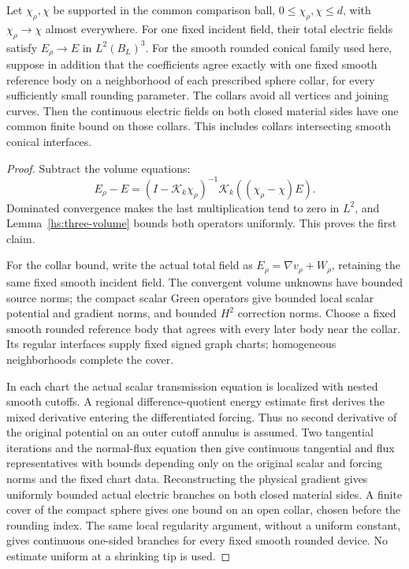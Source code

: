 \begin{lemma}
\label{hs:three-rounding}
Let $\chi_\rho,\chi$ be supported in the common comparison ball,
$0\leq\chi_\rho,\chi\leq d$, with $\chi_\rho\to\chi$ almost
everywhere.  For one fixed incident field, their total electric
fields satisfy $E_\rho\to E$ in $L^2(B_L)^3$.
For the smooth rounded conical family used here, suppose in addition
that the coefficients agree exactly with one fixed smooth reference
body on a neighborhood of each prescribed sphere collar, for every
sufficiently small rounding parameter.  The collars avoid all vertices
and joining curves.  Then the continuous electric fields on both closed
material sides have one common finite bound on those collars.  This
includes collars intersecting smooth conical interfaces.
\end{lemma}

\begin{proof}
Subtract the volume equations:
\begin{equation}
 E_\rho-E=(I-\mathcal K_k\chi_\rho)^{-1}
                  \mathcal K_k((\chi_\rho-\chi)E).
 \label{hs:three-rounding-identity}
\end{equation}
Dominated convergence makes the last multiplication tend to zero
in $L^2$, and Lemma~\ref{hs:three-volume} bounds both operators
uniformly.  This proves the first claim.

For the collar bound, write the actual total field as
$E_\rho=\nabla v_\rho+W_\rho$, retaining the same fixed smooth
incident field.  The convergent volume unknowns have bounded source
norms; the compact scalar Green operators give bounded local scalar
potential and gradient norms, and bounded $H^2$ correction norms.
Choose a fixed smooth rounded reference body that agrees with every
later body near the collar.  Its regular interfaces supply fixed
signed graph charts; homogeneous neighborhoods complete the cover.

In each chart the actual scalar transmission equation is localized
with nested smooth cutoffs.  A regional difference-quotient energy
estimate first derives the mixed derivative entering the differentiated
forcing.  Thus no second derivative of the original potential on an
outer cutoff annulus is assumed.  Two tangential iterations and the
normal-flux equation then give continuous tangential and flux
representatives with bounds depending only on the original scalar and
forcing norms and the fixed chart data.  Reconstructing the physical
gradient gives uniformly bounded actual electric branches on both
closed material sides.  A finite cover of the compact sphere gives
one bound on an open collar, chosen before the rounding index.
The same local regularity argument, without a uniform constant, gives
continuous one-sided branches for every fixed smooth rounded device.
No estimate uniform at a shrinking tip is used.
\end{proof}

